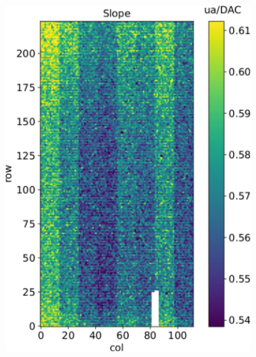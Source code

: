         \begin{figure}[h!]
            \begin{subfigure}{.5\textwidth}
            \centering
            \includegraphics[width=.9\linewidth]{figures/charaterization/slope_map.pdf}
            \end{subfigure}
            \begin{subfigure}{.5\textwidth}
            \centering

\end{subfigure}
\end{figure}
